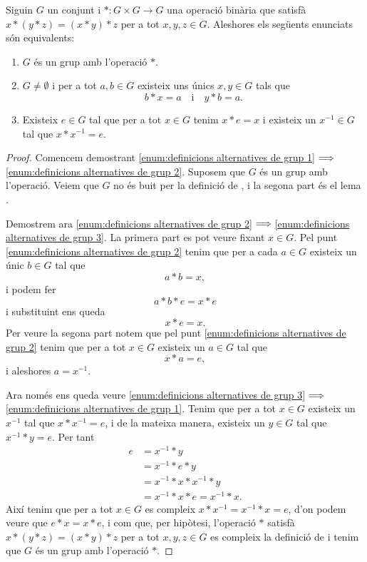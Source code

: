 \documentclass[../Apunts.tex]{subfiles}
\begin{document}
	\begin{theorem}
		\label{thm:definicions alternatives de grup}
		Siguin \(G\) un conjunt i \(\ast\colon G\times G\to G\) una operació binària que satisfà
		\(x\ast(y\ast z)=(x\ast y)\ast z\) per a tot \(x,y,z\in G\). Aleshores els següents enunciats són equivalents:
		\begin{enumerate}
			\item\label{enum:definicions alternatives de grup 1} \(G\) és un grup amb l'operació \(\ast\).
			\item\label{enum:definicions alternatives de grup 2} \(G\neq\emptyset\) i per a tot \(a,b\in G\) existeix uns únics \(x,y\in G\) tals que
			\[b\ast x=a\quad\text{i}\quad y\ast b=a.\]
			\item\label{enum:definicions alternatives de grup 3} Existeix \(e\in G\) tal que per a tot \(x\in G\) tenim \(x\ast e=x\) i existeix un \(x^{-1}\in G\) tal que \(x\ast x^{-1}=e\).
		\end{enumerate}
		\begin{proof}
			Comencem demostrant \eqref{enum:definicions alternatives de grup 1}\(\implies\)\eqref{enum:definicions alternatives de grup 2}. Suposem que \(G\) és un grup amb l'operació. Veiem que \(G\) no és buit per la definició de , i la segona part és el lema .
			
			Demostrem ara \eqref{enum:definicions alternatives de grup 2}\(\implies\)\eqref{enum:definicions alternatives de grup 3}. La primera part es pot veure fixant \(x\in G\). Pel punt \eqref{enum:definicions alternatives de grup 2} tenim que per a cada \(a\in G\) existeix un únic \(b\in G\) tal que
			\[a\ast b=x,\]
			i podem fer
			\[a\ast b\ast e=x\ast e\]
			i substituint ens queda
			\[x\ast e=x.\]
			Per veure la segona part notem que pel punt \eqref{enum:definicions alternatives de grup 2} tenim que per a tot \(x\in G\) existeix un \(a\in G\) tal que
			\[x\ast a=e,\]
			i aleshores \(a=x^{-1}\).
			
			Ara només ens queda veure \eqref{enum:definicions alternatives de grup 3}\(\implies\)\eqref{enum:definicions alternatives de grup 1}. Tenim que per a tot \(x\in G\) existeix un \(x^{-1}\) tal que \(x\ast x^{-1}=e\), i de la mateixa manera, existeix un \(y\in G\) tal que \(x^{-1}\ast y=e\). Per tant
			\begin{align*}
			e&=x^{-1}\ast y\\
			&=x^{-1}\ast e\ast y\\
			&=x^{-1}\ast x\ast x^{-1}\ast y\\
			&=x^{-1}\ast x\ast e=x^{-1}\ast x.
			\end{align*}
			Així tenim que per a tot \(x\in G\) es compleix \(x\ast x^{-1}=x^{-1}\ast x=e\), d'on podem veure que \(e\ast x=x\ast e\), i com que, per hipòtesi, l'operació \(\ast\) satisfà \(x\ast(y\ast z)=(x\ast y)\ast z\) per a tot \(x,y,z\in G\) es compleix la definició de  i tenim que \(G\) és un grup amb l'operació \(\ast\).
			

\end{proof}
\end{theorem}
\end{document}
